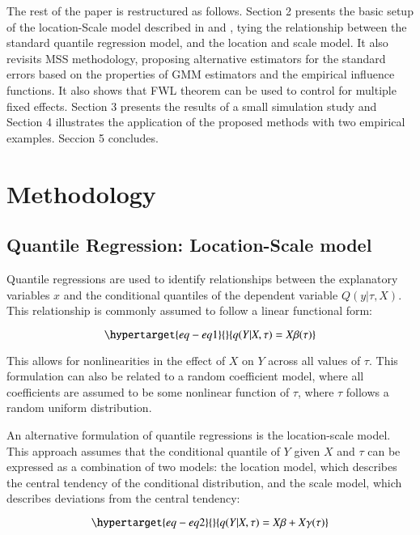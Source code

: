 \documentclass[
  authoryear,
  preprint,
  1p]{elsarticle}
\begin{document}
The rest of the paper is restructured as follows. Section 2 presents the
basic setup of the location-Scale model described in \citet{he1997} and
\citet{zhao2000}, tying the relationship between the standard quantile
regression model, and the location and scale model. It also revisits MSS
methodology, proposing alternative estimators for the standard errors
based on the properties of GMM estimators and the empirical influence
functions. It also shows that FWL theorem can be used to control for
multiple fixed effects. Section 3 presents the results of a small
simulation study and Section 4 illustrates the application of the
proposed methods with two empirical examples. Seccion 5 concludes.

\hypertarget{methodology}{%
\section{Methodology}\label{methodology}}

\hypertarget{sec-betas}{%
\subsection{Quantile Regression: Location-Scale model}\label{sec-betas}}

Quantile regressions are used to identify relationships between the
explanatory variables \(x\) and the conditional quantiles of the
dependent variable \(Q(y|\tau,X)\). This relationship is commonly
assumed to follow a linear functional form:

\begin{equation}\protect\hypertarget{eq-eq1}{}{q(Y|X,\tau) =X\beta(\tau)
}\label{eq-eq1}\end{equation}

This allows for nonlinearities in the effect of \(X\) on \(Y\) across
all values of \(\tau\). This formulation can also be related to a random
coefficient model, where all coefficients are assumed to be some
nonlinear function of \(\tau\), where \(\tau\) follows a random uniform
distribution.

An alternative formulation of quantile regressions is the location-scale
model. This approach assumes that the conditional quantile of \(Y\)
given \(X\) and \(\tau\) can be expressed as a combination of two
models: the location model, which describes the central tendency of the
conditional distribution, and the scale model, which describes
deviations from the central tendency:

\begin{equation}\protect\hypertarget{eq-eq2}{}{q(Y|X,\tau) =X\beta+X\gamma(\tau)
}\label{eq-eq2}\end{equation}
\end{document}
